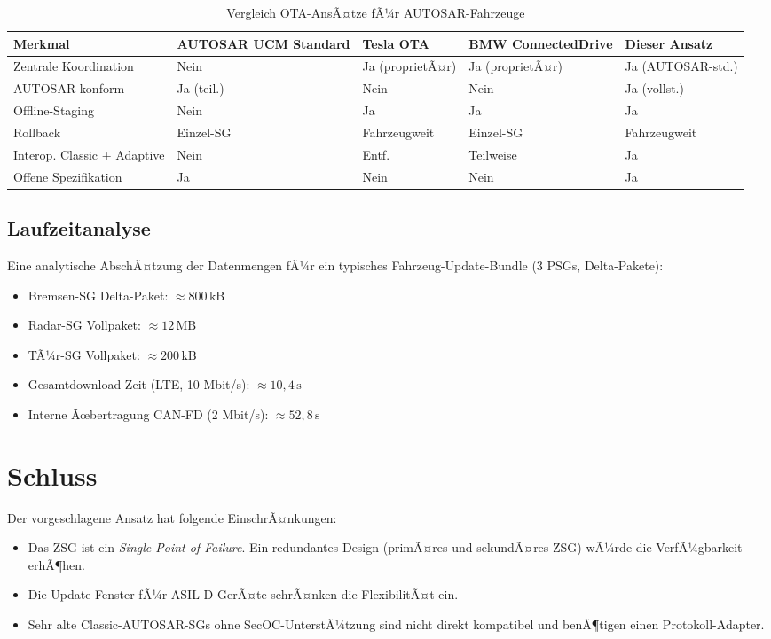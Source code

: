 ﻿\documentclass[12pt,a4paper,twoside]{article}
\begin{document}
\begin{table}[htbp]
  \centering
  \caption{Vergleich OTA-AnsÃ¤tze fÃ¼r AUTOSAR-Fahrzeuge}
  \label{tab:comparison}
  \begin{tabularx}{\textwidth}{lXXXX}
    \toprule
    \textbf{Merkmal} & \textbf{AUTOSAR UCM Standard} &
    \textbf{Tesla OTA} & \textbf{BMW ConnectedDrive} &
    \textbf{Dieser Ansatz} \\
    \midrule
    Zentrale Koordination & Nein & Ja (proprietÃ¤r) & Ja (proprietÃ¤r) & Ja (AUTOSAR-std.) \\
    AUTOSAR-konform & Ja (teil.) & Nein & Nein & Ja (vollst.) \\
    Offline-Staging & Nein & Ja & Ja & Ja \\
    Rollback & Einzel-SG & Fahrzeugweit & Einzel-SG & Fahrzeugweit \\
    Interop. Classic + Adaptive & Nein & Entf. & Teilweise & Ja \\
    Offene Spezifikation & Ja & Nein & Nein & Ja \\
    \bottomrule
  \end{tabularx}
\end{table}

\subsection{Laufzeitanalyse}

Eine analytische AbschÃ¤tzung der Datenmengen fÃ¼r ein typisches
Fahrzeug-Update-Bundle (3 PSGs, Delta-Pakete):

\begin{itemize}
  \item Bremsen-SG Delta-Paket: $\approx 800\,\text{kB}$
  \item Radar-SG Vollpaket: $\approx 12\,\text{MB}$
  \item TÃ¼r-SG Vollpaket: $\approx 200\,\text{kB}$
  \item Gesamtdownload-Zeit (LTE, 10 Mbit/s): $\approx 10{,}4\,\text{s}$
  \item Interne Ãœbertragung CAN-FD (2 Mbit/s): $\approx 52{,}8\,\text{s}$
\end{itemize}


\section{Schluss}

Der vorgeschlagene Ansatz hat folgende EinschrÃ¤nkungen:
\begin{itemize}
  \item Das ZSG ist ein \emph{Single Point of Failure}. Ein redundantes
    Design (primÃ¤res und sekundÃ¤res ZSG) wÃ¼rde die VerfÃ¼gbarkeit erhÃ¶hen.
  \item Die Update-Fenster fÃ¼r ASIL-D-GerÃ¤te schrÃ¤nken die FlexibilitÃ¤t ein.
  \item Sehr alte Classic-AUTOSAR-SGs ohne SecOC-UnterstÃ¼tzung sind nicht
    direkt kompatibel und benÃ¶tigen einen Protokoll-Adapter.
\end{itemize}
\end{document}
